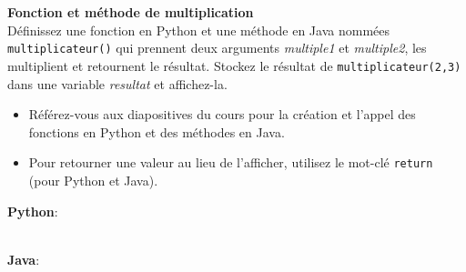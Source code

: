     \begin{Exercice} \textbf{Fonction et méthode de multiplication}\\
    Définissez une fonction en Python et une méthode en Java nommées \lstinline{multiplicateur()} qui prennent deux arguments \textit{multiple1} et \textit{multiple2}, les multiplient et retournent le résultat. Stockez le résultat de \lstinline{multiplicateur(2,3)} dans une variable \textit{resultat} et affichez-la.   \\

    \begin{conseil}
        \begin{itemize}
            \item Référez-vous aux diapositives du cours pour la création et l'appel des fonctions en Python et des méthodes en Java.
            \item Pour retourner une valeur au lieu de l'afficher, utilisez le mot-clé \lstinline{return} (pour Python et Java).
        \end{itemize}        
    \end{conseil}
    \begin{solution}
        \textbf{Python}:
        
        
        \textbf{\\Java}:
        
    \end{solution}   
\end{Exercice} 
  
